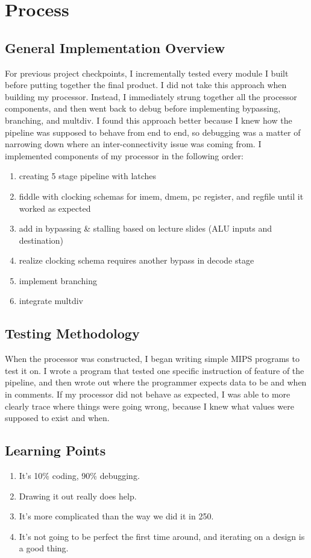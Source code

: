 \documentclass[letterpaper]{article}
\begin{document}
\section{Process}
\subsection{General Implementation Overview}
For previous project checkpoints, I incrementally tested every module I built before putting together the final product. I did not take this approach when building my processor. Instead, I immediately strung together all the processor components, and then went back to debug before implementing bypassing, branching, and multdiv. I found this approach better because I knew how the pipeline was supposed to behave from end to end, so debugging was a matter of narrowing down where an inter-connectivity issue was coming from. I implemented components of my processor in the following order:
\begin{enumerate}
    \item creating 5 stage pipeline with latches
    \item fiddle with clocking schemas for imem, dmem, pc register, and regfile until it worked as expected
    \item add in bypassing & stalling based on lecture slides (ALU inputs and destination)
    \item realize clocking schema requires another bypass in decode stage
    \item implement branching
    \item integrate multdiv
\end{enumerate}

\subsection{Testing Methodology}
When the processor was constructed, I began writing simple MIPS programs to test it on. I wrote a program that tested one specific instruction of feature of the pipeline, and then wrote out where the programmer expects data to be and when in comments. If my processor did not behave as expected, I was able to more clearly trace where things were going wrong, because I knew what values were supposed to exist and when.

\subsection{Learning Points}
\begin{enumerate}
    \item It's 10\% coding, 90\% debugging.
    \item Drawing it out really does help.
    \item It's more complicated than the way we did it in 250.
    \item It's not going to be perfect the first time around, and iterating on a design is a good thing.
\end{enumerate}
\end{document}
